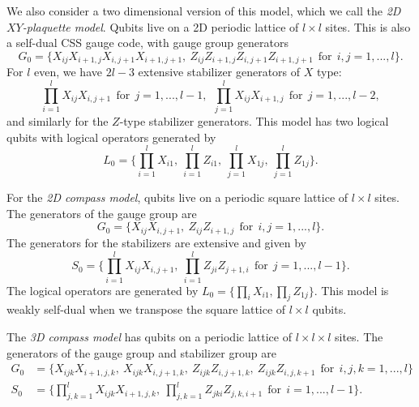 \documentclass[11pt,oneside]{article}
\def\Stab{S}
\begin{document}
We also consider a two dimensional version of this
model, which we call the \emph{2D $XY$-plaquette model}.
Qubits live on a 2D periodic lattice of $l\times l$ sites.
This is also a self-dual CSS gauge code, with 
gauge group generators 
$$
    G_0 = \{
        X_{ij}X_{i+1,j}X_{i,j+1}X_{i+1,j+1},\ 
        Z_{ij}Z_{i+1,j}Z_{i,j+1}Z_{i+1,j+1}
        \ \ \mbox{for}\ \ i,j=1,...,l \}.
$$
For $l$ even, we have $2l-3$ extensive stabilizer generators of $X$ type:
$$
    \prod_{i=1}^l X_{ij} X_{i,j+1} \ \ \mbox{for}\ \ j=1,...,l-1,\ \ 
    \prod_{j=1}^l X_{ij} X_{i+1,j} \ \ \mbox{for}\ \ j=1,...,l-2,
$$
and similarly for the $Z$-type stabilizer generators.
This model has two logical qubits with logical operators 
generated by
$$
    L_0 = \Big\{ 
            \prod_{i=1}^l X_{i1}, \ 
            \prod_{i=1}^l Z_{i1}, \ 
            \prod_{j=1}^l X_{1j},\ 
            \prod_{j=1}^l Z_{1j}
        \Big\}.
$$


For the \emph{2D compass model}\cite{Bacon2006},
qubits live on a periodic square lattice of $l\times l$ sites.
The generators of the gauge group are
$$
    G_0 = \big\{ X_{ij}X_{i,j+1},\ Z_{ij}Z_{i+1,j}\ \
        \mbox{for}\ \ i,j = 1,...,l\big\}.
$$
The generators for the stabilizers are
extensive and given by
$$
    \Stab_0 = \Big\{ \prod_{i=1}^l X_{ij}X_{i,j+1},\ \prod_{i=1}^l Z_{ji}Z_{j+1,i}
        \ \ \mbox{for}\ \ j=1,...,l-1\Big\}.
$$
The logical operators are generated by 
$L_0 = \big\{ \prod_i X_{i1}, \prod_j Z_{1j} \big\}.$
This model is weakly self-dual when we transpose
the square lattice of $l\times l$ qubits.

The \emph{3D compass model}\cite{Bacon2006}
has qubits on a periodic lattice of $l\times l\times l$
sites.
The generators of the gauge group and stabilizer group are
\begin{align*}
    G_0 &= \big\{ 
        X_{ijk}X_{i+1,j,k},\ 
        X_{ijk}X_{i,j+1,k},\ 
        Z_{ijk}Z_{i,j+1,k},\ 
        Z_{ijk}Z_{i,j,k+1}\ 
        \ \mbox{for}\ \ i, j, k = 1,...,l\big\}\\
    \Stab_0 &= \Big\{ 
        \prod_{j,k=1}^l X_{ijk}X_{i+1,j,k},\ 
        \prod_{j,k=1}^l Z_{jki}Z_{j,k,i+1}\ \ 
            \mbox{for}\ \ i=1,...,l-1\Big\}.
\end{align*}
\end{document}
